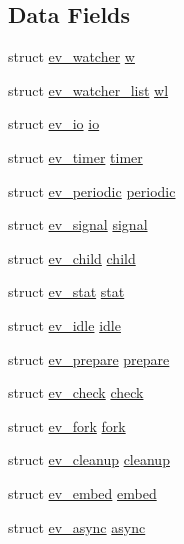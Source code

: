 \subsection*{\-Data \-Fields}
\begin{DoxyCompactItemize}
\item 
struct \hyperlink{structev__watcher}{ev\-\_\-watcher} \hyperlink{unionev__any__watcher_a9516a8125893e72f22e7012717dad6d8}{w}
\item 
struct \hyperlink{structev__watcher__list}{ev\-\_\-watcher\-\_\-list} \hyperlink{unionev__any__watcher_ae2011b7703dba910528f85c51f9e2214}{wl}
\item 
struct \hyperlink{structev__io}{ev\-\_\-io} \hyperlink{unionev__any__watcher_a8a4fa321488e67a96ad783dc24187c4c}{io}
\item 
struct \hyperlink{structev__timer}{ev\-\_\-timer} \hyperlink{unionev__any__watcher_af2da8c0826c21eddd57a904ce5db7411}{timer}
\item 
struct \hyperlink{structev__periodic}{ev\-\_\-periodic} \hyperlink{unionev__any__watcher_a38b502fe39dbdf9208d295a9562781d0}{periodic}
\item 
struct \hyperlink{structev__signal}{ev\-\_\-signal} \hyperlink{unionev__any__watcher_a72308cea3a8da64c8b7e63a72645258b}{signal}
\item 
struct \hyperlink{structev__child}{ev\-\_\-child} \hyperlink{unionev__any__watcher_ae1125f192c1eb184294efd761ed9b7de}{child}
\item 
struct \hyperlink{structev__stat}{ev\-\_\-stat} \hyperlink{unionev__any__watcher_a4e2a569765766cdcda2cead6946aa7b5}{stat}
\item 
struct \hyperlink{structev__idle}{ev\-\_\-idle} \hyperlink{unionev__any__watcher_a873722b2eacfc6fdbf2cccbf3a3d90b9}{idle}
\item 
struct \hyperlink{structev__prepare}{ev\-\_\-prepare} \hyperlink{unionev__any__watcher_a87bf9c1da33923ce13a50b4fa6e2b572}{prepare}
\item 
struct \hyperlink{structev__check}{ev\-\_\-check} \hyperlink{unionev__any__watcher_a2b3de3d8f728c8ee5a2fc71499a6c4ea}{check}
\item 
struct \hyperlink{structev__fork}{ev\-\_\-fork} \hyperlink{unionev__any__watcher_ab915eaa6312f56672c8ca4cb1692e87c}{fork}
\item 
struct \hyperlink{structev__cleanup}{ev\-\_\-cleanup} \hyperlink{unionev__any__watcher_aeafce63f71f8dceb78babad901832f01}{cleanup}
\item 
struct \hyperlink{structev__embed}{ev\-\_\-embed} \hyperlink{unionev__any__watcher_abe8c0d216686c4c099394502acff8303}{embed}
\item 
struct \hyperlink{structev__async}{ev\-\_\-async} \hyperlink{unionev__any__watcher_a56b1e7af8c270020043037a796260aa1}{async}
\end{DoxyCompactItemize}


